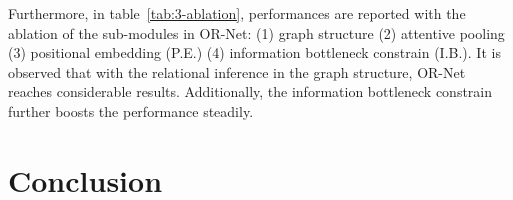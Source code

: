 \documentclass[sigconf]{acmart} %
\newcommand{\qy}[1]{\textcolor{blue}{#1}}
\begin{document}


Furthermore, in table~\ref{tab:3-ablation}, performances are reported with the ablation of the sub-modules in OR-Net: (1) graph structure (2) attentive pooling (3) positional embedding (P.E.) (4) information bottleneck constrain (I.B.). It is observed that with the relational inference in the graph structure, OR-Net reaches considerable results. Additionally, the information bottleneck constrain further boosts the performance steadily.






\section{Conclusion}
\end{document}
